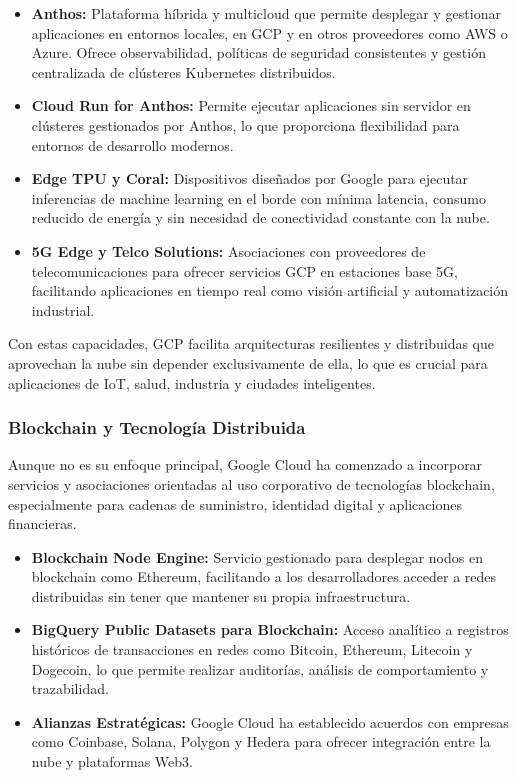 {                \begin{itemize}
                    \item \textbf{Anthos:} Plataforma híbrida y multicloud que permite desplegar y gestionar aplicaciones en entornos locales, en GCP y en otros proveedores como AWS o Azure. Ofrece observabilidad, políticas de seguridad consistentes y gestión centralizada de clústeres Kubernetes distribuidos.
                    \item \textbf{Cloud Run for Anthos:} Permite ejecutar aplicaciones sin servidor en clústeres gestionados por Anthos, lo que proporciona flexibilidad para entornos de desarrollo modernos.
                    \item \textbf{Edge TPU y Coral:} Dispositivos diseñados por Google para ejecutar inferencias de machine learning en el borde con mínima latencia, consumo reducido de energía y sin necesidad de conectividad constante con la nube.
                    \item \textbf{5G Edge y Telco Solutions:} Asociaciones con proveedores de telecomunicaciones para ofrecer servicios GCP en estaciones base 5G, facilitando aplicaciones en tiempo real como visión artificial y automatización industrial.
                \end{itemize}
                
                Con estas capacidades, GCP facilita arquitecturas resilientes y distribuidas que aprovechan la nube sin depender exclusivamente de ella, lo que es crucial para aplicaciones de IoT, salud, industria y ciudades inteligentes.
                
            \subsubsection{Blockchain y Tecnología Distribuida}
                Aunque no es su enfoque principal, Google Cloud ha comenzado a incorporar servicios y asociaciones orientadas al uso corporativo de tecnologías blockchain, especialmente para cadenas de suministro, identidad digital y aplicaciones financieras.
                
                \begin{itemize}
                    \item \textbf{Blockchain Node Engine:} Servicio gestionado para desplegar nodos en blockchain como Ethereum, facilitando a los desarrolladores acceder a redes distribuidas sin tener que mantener su propia infraestructura.
                    \item \textbf{BigQuery Public Datasets para Blockchain:} Acceso analítico a registros históricos de transacciones en redes como Bitcoin, Ethereum, Litecoin y Dogecoin, lo que permite realizar auditorías, análisis de comportamiento y trazabilidad.
                    \item \textbf{Alianzas Estratégicas:} Google Cloud ha establecido acuerdos con empresas como Coinbase, Solana, Polygon y Hedera para ofrecer integración entre la nube y plataformas Web3.
                \end{itemize}
                
}

